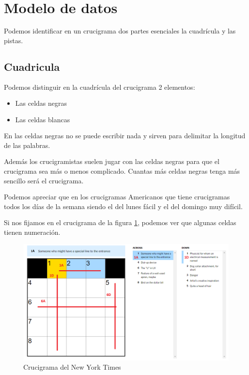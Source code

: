 \documentclass[12pt, a4paper]{article}
\begin{document}
\section{Modelo de datos}

Podemos identificar en un crucigrama dos partes esenciales la cuadrícula y
las pistas.

\subsection{Cuadricula}

Podemos distinguir en la cuadrícula del crucigrama 2 elementos:

\begin{itemize}
	\item Las celdas negras
	\item Las celdas blancas
\end{itemize}

En las celdas negras no se puede escribir nada y sirven para delimitar
la longitud de las palabras.

Además los crucigramistas suelen jugar con las celdas negras para que el
crucigrama sea más o menos complicado. Cuantas más celdas negras tenga más
sencillo será el crucigrama.

Podemos apreciar que en los crucigramas Americanos  que tiene crucigramas todos los días de la semana siendo el del lunes
fácil y el del domingo muy difícil.

Si nos fijamos en el crucigrama de la figura \ref{fig:xwordNYT}, podemos
ver que algunas celdas tienen numeración.


\begin{figure}
	\includegraphics[width=\textwidth]{img/new-york-times-xword.png}
	\centering
	\caption{Crucigrama del New York Times}
	\label{fig:xwordNYT}
\end{figure}
\end{document}
